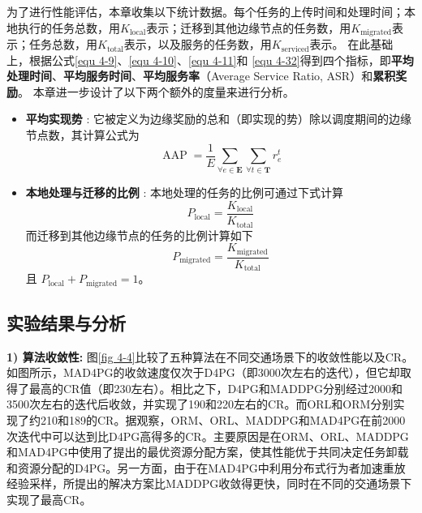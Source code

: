 为了进行性能评估，本章收集以下统计数据。每个任务的上传时间和处理时间；本地执行的任务总数，用$K_{\operatorname{local}}$表示；迁移到其他边缘节点的任务数，用$K_{\operatorname{migrated}}$表示；任务总数，用$K_{\operatorname{total}}$表示，以及服务的任务数，用$K_{\operatorname{serviced}}$表示。
在此基础上，根据公式\ref{equ 4-9}、\ref{equ 4-10}、\ref{equ 4-11}和 \ref{equ 4-32}得到四个指标，即\textbf{平均处理时间}、\textbf{平均服务时间}、\textbf{平均服务率}（Average Service Ratio, ASR）和\textbf{累积奖励}。
本章进一步设计了以下两个额外的度量来进行分析。
\begin{itemize}
	\item \textbf{平均实现势} : 它被定义为边缘奖励的总和（即实现的势）除以调度期间的边缘节点数，其计算公式为
		\begin{equation}
		 	 \operatorname{AAP} = \frac{1}{E}\sum_{\forall e \in \mathbf{E}} \sum_{\forall t \in \mathbf{T}} r_{e}^{t}
		\end{equation}
	\item \textbf{本地处理与迁移的比例} : 本地处理的任务的比例可通过下式计算
		\begin{equation}
			P_{\operatorname{local}} = \frac{K_{\operatorname{local}}}{K_{\operatorname{total}}}
		\end{equation}
		而迁移到其他边缘节点的任务的比例计算如下 
		\begin{equation}
			P_{\operatorname{migrated}} = \frac{K_{\operatorname{migrated}}}{K_{\operatorname{total}}}
		\end{equation}
		且 $P_{\operatorname{local}} +P_{\operatorname{migrated}} = 1$。
\end{itemize}

\subsection{实验结果与分析}

\textbf{1) 算法收敛性:} 图\ref{fig 4-4}比较了五种算法在不同交通场景下的收敛性能以及CR。如图所示，MAD4PG的收敛速度仅次于D4PG（即3000次左右的迭代），但它却取得了最高的CR值（即230左右）。相比之下，D4PG和MADDPG分别经过2000和3500次左右的迭代后收敛，并实现了190和220左右的CR。而ORL和ORM分别实现了约210和189的CR。据观察，ORM、ORL、MADDPG和MAD4PG在前2000次迭代中可以达到比D4PG高得多的CR。主要原因是在ORM、ORL、MADDPG和MAD4PG中使用了提出的最优资源分配方案，使其性能优于共同决定任务卸载和资源分配的D4PG。另一方面，由于在MAD4PG中利用分布式行为者加速重放经验采样，所提出的解决方案比MADDPG收敛得更快，同时在不同的交通场景下实现了最高CR。


